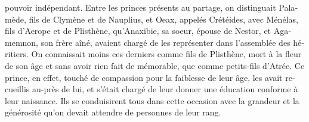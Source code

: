 \documentclass{article}
\begin{document}
\begin{pages}
\begin{Leftside}
\begin{french}
pouvoir indépendant. Entre les princes présents au partage, on distinguait Palamède, fils de Clymène et de Nauplius, et Oeax, appelés Crétéides, avec Ménélas, fils d'Ae\-ro\-pe et de Plisthène, qu'Anaxibie, sa soeur, épouse de Nestor, et Agamemnon, son frère aîné, avaient chargé de les représenter dans l'assemblée des héritiers. On connaissait moins ces derniers comme fils de Plisthène, mort à la fleur de son âge et sans avoir rien fait de mémorable, que comme petits-fils d'Atrée. Ce prince, en effet, touché de compassion pour la faiblesse de leur âge, les avait recueillis au-près de lui, et s'était chargé de leur donner une éducation conforme à leur naissance. Ils se conduisirent tous dans cette occasion avec la grandeur et la générosité qu'on devait attendre de personnes de leur rang.
 \pend
 \pstart


\end{french}
\end{Leftside}
\end{pages}
\end{document}
